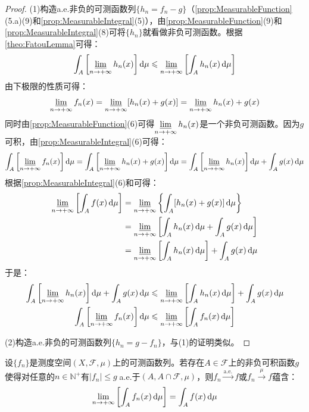 \begin{proof}
	(1)构造a.e.非负的可测函数列$\{h_n=f_n-g\}$（\cref{prop:MeasurableFunction}(5.a)(9)和\cref{prop:MeasurableIntegral}(5)），由\cref{prop:MeasurableFunction}(9)和\cref{prop:MeasurableIntegral}(8)可将$\{h_n\}$就看做非负可测函数。根据\cref{theo:FatouLemma}可得：
	\begin{equation*}
		\int_{A}\left[\varliminf_{n\to+\infty}h_n(x)\right]\mathop{}\!\mathrm{d}\mu\leqslant\varliminf_{n\to+\infty}\left[\int_{A}h_n(x)\mathop{}\!\mathrm{d}\mu\right]
	\end{equation*}
	由下极限的性质可得：
	\begin{equation*}
		\varliminf_{n\to+\infty}f_n(x)=\varliminf_{n\to+\infty}[h_n(x)+g(x)]=\varliminf_{n\to+\infty}h_n(x)+g(x)
	\end{equation*}
	同时由\cref{prop:MeasurableFunction}(6)可得$\varliminf\limits_{n\to+\infty}h_n(x)$是一个非负可测函数。因为$g$可积，由\cref{prop:MeasurableIntegral}(6)可得：
	\begin{equation*}
		\int_{A}\left[\varliminf_{n\to+\infty}f_n(x)\right]\mathop{}\!\mathrm{d}\mu=\int_{A}\left[\varliminf_{n\to+\infty}h_n(x)+g(x)\right]\mathop{}\!\mathrm{d}\mu=\int_{A}\left[\varliminf_{n\to+\infty}h_n(x)\right]\mathop{}\!\mathrm{d}\mu+\int_{A}g(x)\mathop{}\!\mathrm{d}\mu
	\end{equation*}
	根据\cref{prop:MeasurableIntegral}(6)和可得：
	\begin{align*}
		\varliminf_{n\to+\infty}\left[\int_{A}f(x)\mathop{}\!\mathrm{d}\mu\right]&=\varliminf_{n\to+\infty}\left\{\int_{A}[h_n(x)+g(x)]\mathop{}\!\mathrm{d}\mu\right\} \\
		&=\varliminf_{n\to+\infty}\left[\int_{A}h_n(x)\mathop{}\!\mathrm{d}\mu+\int_{A}g(x)\mathop{}\!\mathrm{d}\mu\right] \\
		&=\varliminf_{n\to+\infty}\left[\int_{A}h_n(x)\mathop{}\!\mathrm{d}\mu\right]+\int_{A}g(x)\mathop{}\!\mathrm{d}\mu
	\end{align*}
	于是：
	\begin{gather*}
		\int_{A}\left[\varliminf_{n\to+\infty}h_n(x)\right]\mathop{}\!\mathrm{d}\mu+\int_{A}g(x)\mathop{}\!\mathrm{d}\mu\leqslant\varliminf_{n\to+\infty}\left[\int_{A}h_n(x)\mathop{}\!\mathrm{d}\mu\right]+\int_{A}g(x)\mathop{}\!\mathrm{d}\mu \\
		\int_{A}\left[\varliminf_{n\to+\infty}f_n(x)\right]\mathop{}\!\mathrm{d}\mu\leqslant\varliminf_{n\to+\infty}\left[\int_{A}f_n(x)\mathop{}\!\mathrm{d}\mu\right]
	\end{gather*}\par
	(2)构造a.e.非负的可测函数列$\{h_n=g-f_n\}$，与(1)的证明类似。
\end{proof}
\begin{theorem}[Lebesgue控制收敛定理]\label{theo:DominatedConvergenceTheorem}
	设$\{f_n\}$是测度空间$(X,\mathscr{F},\mu)$上的可测函数列。若存在$A\in\mathscr{F}$上的非负可积函数$g$使得对任意的$n\in\mathbb{N}^+$有$|f_n|\leqslant g\;$a.e.于$(A,A\cap\mathscr{F},\mu)$，则$f_n\overset{\text{a.e.}}{\longrightarrow}f$或$f_n\overset{\mu}{\longrightarrow}f$蕴含：
	\begin{equation*}
		\lim_{n\to+\infty}\left[\int_{A}f_n(x)\mathop{}\!\mathrm{d}\mu\right]=\int_{A}f(x)\mathop{}\!\mathrm{d}\mu
	\end{equation*}
\end{theorem}
